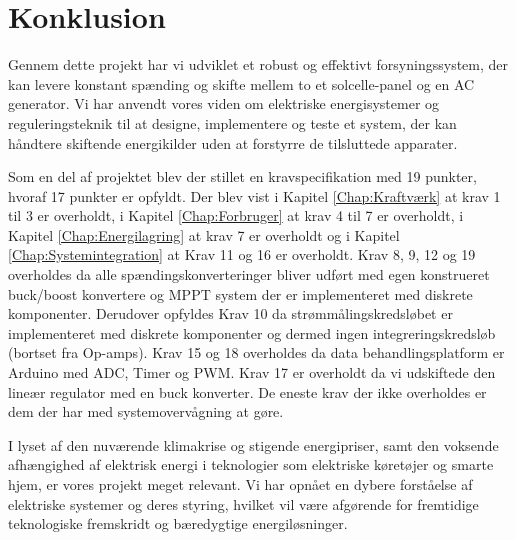 \documentclass[../main.tex]{subfiles}
\begin{document}
\chapter{Konklusion} \label{Chap:Konklusion}
Gennem dette projekt har vi udviklet et robust og effektivt forsyningssystem, der kan levere konstant spænding og skifte mellem to et solcelle-panel og en AC generator. Vi har anvendt vores viden om elektriske energisystemer og reguleringsteknik til at designe, implementere og teste et system, der kan håndtere skiftende energikilder uden at forstyrre de tilsluttede apparater.

Som en del af projektet blev der stillet en kravspecifikation med 19 punkter, hvoraf 17 punkter er opfyldt. Der blev vist i Kapitel \ref{Chap:Kraftværk} at krav 1 til 3 er overholdt, i Kapitel \ref{Chap:Forbruger} at krav 4 til 7 er overholdt, i Kapitel \ref{Chap:Energilagring} at krav 7 er overholdt og i Kapitel \ref{Chap:Systemintegration} at Krav 11 og 16 er overholdt. Krav 8, 9, 12 og 19 overholdes da alle spændingskonverteringer bliver udført med egen konstrueret buck/boost konvertere og MPPT system der er implementeret med diskrete komponenter. Derudover opfyldes Krav 10 da strømmålingskredsløbet er implementeret med diskrete komponenter og dermed ingen integreringskredsløb (bortset fra Op-amps). Krav 15 og 18 overholdes da data behandlingsplatform er Arduino med ADC, Timer og PWM. Krav 17 er overholdt da vi udskiftede den lineær regulator med en buck konverter. De eneste krav der ikke overholdes er dem der har med systemovervågning at gøre. 

I lyset af den nuværende klimakrise og stigende energipriser, samt den voksende afhængighed af elektrisk energi i teknologier som elektriske køretøjer og smarte hjem, er vores projekt meget relevant. Vi har opnået en dybere forståelse af elektriske systemer og deres styring, hvilket vil være afgørende for fremtidige teknologiske fremskridt og bæredygtige energiløsninger.
\end{document}
